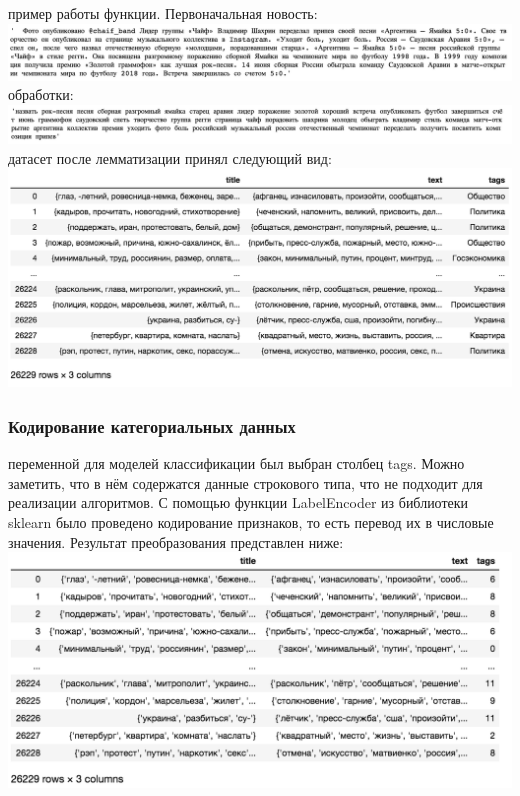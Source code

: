 \documentclass{article}
\newcommand\tab[1][1cm]{\hspace*{#1}}
\begin{document}
 пример работы функции. Первоначальная новость:\\
\includegraphics[scale=0.55]{f5.png}\\
 обработки:\\
\includegraphics[scale=0.55]{f6.png}\\
 датасет после лемматизации принял следующий вид:\\
\includegraphics[scale=0.8]{f8.png}\\
\subsubsection{Кодирование категориальных данных}
 переменной для моделей классификации был выбран столбец tags. Можно заметить, что в нём содержатся данные строкового типа, что не подходит для реализации алгоритмов. С помощью функции LabelEncoder из библиотеки sklearn было проведено кодирование признаков, то есть перевод их в числовые значения. Результат преобразования представлен ниже:\\
\includegraphics[scale=0.9]{f10.png}\\
\end{document}

